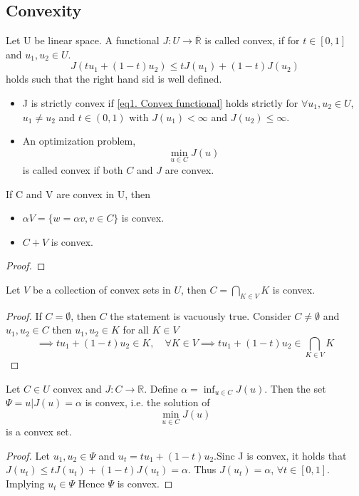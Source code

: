 \subsection{Convexity}
\begin{definition}
	Let U be linear space. A functional $J:U\rightarrow \overline{\mathbb{R}}$ is called convex, if for $t\in[0,1]$ and $u_1, u_2 \in U$.
	\begin{equation}
		J(tu_1+(1-t)u_2)\leq t J(u_1)+(1-t)J(u_2) \label{eq1. Convex functional}
	\end{equation}
	holds such that the right hand sid is well defined.
	\begin{itemize}
	\item 	J is strictly convex if \eqref{eq1. Convex functional} holds strictly for $\forall u_1, u_2 \in U$, $u_1\neq u_2$ and $t \in (0,1)$ with $J(u_1)<\infty$ and $J(u_2)\leq \infty$.
	\item An optimization problem, 
	\[
		\min_{u \in C} J(u)
	\] is called convex if both $C$ and $J$ are convex.
	\end{itemize}
\end{definition}

\begin{lemma}
	If C and V are convex in U, then
	\begin{itemize}
		\item  $\alpha V = \lbrace w = \alpha v, v\in C \rbrace$ is convex.
		\item $C+V$ is convex.
	\end{itemize}
	\begin{proof}
		
	\end{proof}
\end{lemma}


\begin{lemma}
	Let $V$ be a collection of convex sets in $U$, then $C=\bigcap_{K \in V} K$ is convex.
	\begin{proof}
			If $C = \emptyset$, then $C$ the statement is vacuously true. Consider $C\neq \emptyset$ and $u_1, u_2 \in C$ then $u_1, u_2 \in K$ for all $K \in V$
			\[
			\implies tu_1+(1-t)u_2 \in K, \quad \forall K \in V \implies tu_1+(1-t)u_2 \in \bigcap_{K \in V} K 
			\]
	\end{proof}
\end{lemma}

\begin{lemma}
		Let $C\in U$ convex and $J: C \rightarrow \mathbb{R}$. Define $\alpha=\inf_{u\in C} J(u)$. Then the set $\Psi = {u | J(u)=\alpha}$ is convex, i.e. the solution of 
		\[
			\min_{u \in C} J(u)
		\] 
		is a convex set.
		\begin{proof}
			Let $u_1, u_2 \in \Psi$ and $u_t=tu_1+(1-t)u_2$.Sinc J is convex, it holds that
			$J(u_t)\leq t J(u_t)+(1-t)J(u_t)=\alpha$. Thus $J(u_t)=\alpha$, $\forall t \in [0,1]$. Implying $u_t \in \Psi$ Hence $\Psi$ is convex.
		\end{proof}
\end{lemma}

